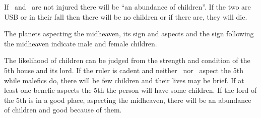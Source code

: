 If \Jupiter\, and \Mercury\, are not injured there will be ``an abundance of children''. If the two are USB or in their fall then there will be no children or if there are, they will die.

The planets aspecting the midheaven, its sign and aspects and the sign following the midheaven indicate male and female children.

The likelihood of children can be judged from the strength and condition of the 5th house and its lord. If the ruler is cadent and neither \Jupiter\, nor \Venus\, aspect the 5th while malefics do, there will be few children and their lives may be brief. If at least one benefic aspects the 5th the person will have some children. If the lord of the 5th is in a good place, aspecting the midheaven, there will be an abundance of children and good because of them.

